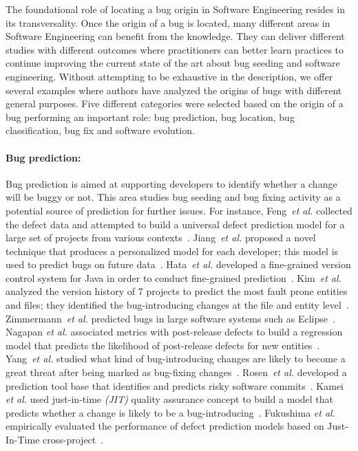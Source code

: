 \documentclass[a4paper, 12pt]{book}
\begin{document}
The foundational role of locating a bug origin in Software Engineering resides in its transversality. Once the origin of a bug is located, many different areas in Software Engineering can benefit from the knowledge. They can deliver different studies with different outcomes where practitioners can better learn practices to continue improving the current state of the art about bug seeding and software engineering. Without attempting to be exhaustive in the description, we offer several examples where authors have analyzed the origins of bugs with different general purposes. Five different categories were selected based on the origin of a bug performing an important role: bug prediction, bug location, bug classification, bug fix and software evolution.

\paragraph{Bug prediction:} Bug prediction is aimed at supporting developers to identify whether a change will be buggy or not. This area studies bug seeding and bug fixing activity as a potential source of prediction for further issues. For instance, Feng~\textit{et al.} collected the defect data and attempted to build a universal defect prediction model for a large set of projects from various contexts~\cite{zhang2014towards}. Jiang~\textit{et al.} proposed a novel technique that produces a personalized model for each developer; this model is used to predict bugs on future data~\cite{jiang2013personalized}. Hata~\textit{et al.} developed a fine-grained version control system for Java in order to conduct fine-grained prediction~\cite{hata2012bug}. Kim~\textit{et al.} analyzed the version history of 7 projects to predict the most fault prone entities and files; they identified the bug-introducing changes at the file and entity level~\cite{kim2007predicting}. Zimmermann~\emph{et al.} predicted bugs in large software systems such as Eclipse~\cite{zimmermann2007predicting}. Nagapan \emph{et al.} associated metrics with post-release defects to build a regression model that predicts the likelihood of post-release defects for new entities~\cite{nagappan2006mining}. Yang~\textit{et al.} studied what kind of bug-introducing changes are likely to become a great threat after being marked as bug-fixing changes~\cite{yang2014bug}. Rosen~\textit{et al.} developed a prediction tool base that identifies and predicts risky software commits~\cite{rosen2015commit}. Kamei \emph{et al.} used just-in-time \emph{(JIT)} quality assurance concept to build a model that predicts whether a change is likely to be a bug-introducing~\cite{kamei2013large}. Fukushima \emph{et al.} empirically evaluated the performance of defect prediction models based on Just-In-Time cross-project~\cite{fukushima2014empirical}.
\end{document}
